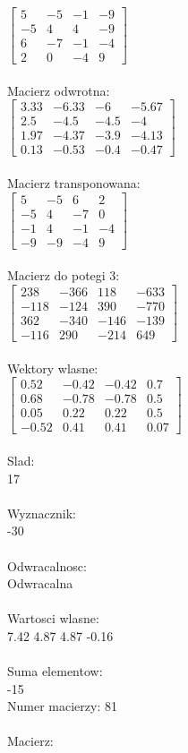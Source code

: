 \documentclass[a4paper,12pt]{article}
\begin{document}
$\begin{bmatrix} 5&-5&-1&-9\\-5&4&4&-9\\6&-7&-1&-4\\2&0&-4&9 \end{bmatrix}$
\\
\\
Macierz odwrotna:\\

$\begin{bmatrix} 3.33&-6.33&-6&-5.67\\2.5&-4.5&-4.5&-4\\1.97&-4.37&-3.9&-4.13\\0.13&-0.53&-0.4&-0.47 \end{bmatrix}$
\\
\\
Macierz transponowana:\\

$\begin{bmatrix} 5&-5&6&2\\-5&4&-7&0\\-1&4&-1&-4\\-9&-9&-4&9 \end{bmatrix}$
\\
\\
Macierz do potegi 3:\\

$\begin{bmatrix} 238&-366&118&-633\\-118&-124&390&-770\\362&-340&-146&-139\\-116&290&-214&649 \end{bmatrix}$
\\
\\
Wektory wlasne:\\

$\begin{bmatrix} 0.52&-0.42&-0.42&0.7\\0.68&-0.78&-0.78&0.5\\0.05&0.22&0.22&0.5\\-0.52&0.41&0.41&0.07 \end{bmatrix}$
\\
\\
Slad:\\
17
\\
\\
Wyznacznik:\\
-30
\\
\\
Odwracalnosc:\\
Odwracalna
\\
\\
Wartosci wlasne:\\
7.42 4.87 4.87 -0.16
\\
\\
Suma elementow:\\
-15
\\
\newpage
Numer macierzy:
81
\\
\\
Macierz:\\
\end{document}
